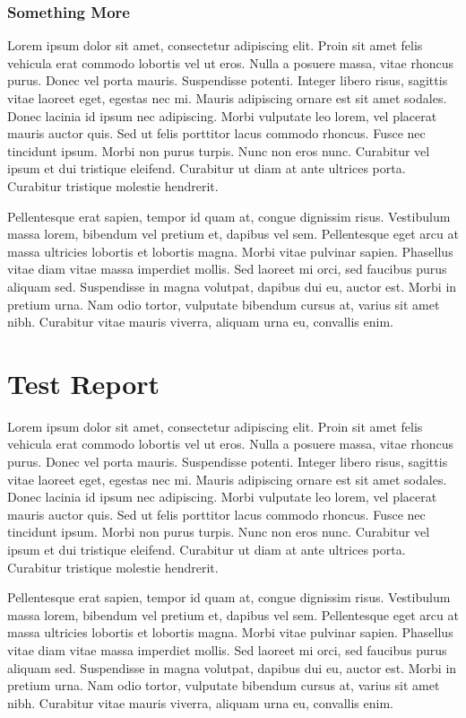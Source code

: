 \documentclass{vitmsprojectreport}
\begin{document}
\subsubsection{Something More}

Lorem ipsum dolor sit amet, consectetur adipiscing elit. Proin sit amet felis vehicula erat commodo lobortis vel ut eros. Nulla a posuere massa, vitae rhoncus purus. Donec vel porta mauris. Suspendisse potenti. Integer libero risus, sagittis vitae laoreet eget, egestas nec mi. Mauris adipiscing ornare est sit amet sodales. Donec lacinia id ipsum nec adipiscing. Morbi vulputate leo lorem, vel placerat mauris auctor quis. Sed ut felis porttitor lacus commodo rhoncus. Fusce nec tincidunt ipsum. Morbi non purus turpis. Nunc non eros nunc. Curabitur vel ipsum et dui tristique eleifend. Curabitur ut diam at ante ultrices porta. Curabitur tristique molestie hendrerit.

Pellentesque erat sapien, tempor id quam at, congue dignissim risus. Vestibulum massa lorem, bibendum vel pretium et, dapibus vel sem. Pellentesque eget arcu at massa ultricies lobortis et lobortis magna. Morbi vitae pulvinar sapien. Phasellus vitae diam vitae massa imperdiet mollis. Sed laoreet mi orci, sed faucibus purus aliquam sed. Suspendisse in magna volutpat, dapibus dui eu, auctor est. Morbi in pretium urna. Nam odio tortor, vulputate bibendum cursus at, varius sit amet nibh. Curabitur vitae mauris viverra, aliquam urna eu, convallis enim.

\section{Test Report}

Lorem ipsum dolor sit amet, consectetur adipiscing elit. Proin sit amet felis vehicula erat commodo lobortis vel ut eros. Nulla a posuere massa, vitae rhoncus purus. Donec vel porta mauris. Suspendisse potenti. Integer libero risus, sagittis vitae laoreet eget, egestas nec mi. Mauris adipiscing ornare est sit amet sodales. Donec lacinia id ipsum nec adipiscing. Morbi vulputate leo lorem, vel placerat mauris auctor quis. Sed ut felis porttitor lacus commodo rhoncus. Fusce nec tincidunt ipsum. Morbi non purus turpis. Nunc non eros nunc. Curabitur vel ipsum et dui tristique eleifend. Curabitur ut diam at ante ultrices porta. Curabitur tristique molestie hendrerit.

Pellentesque erat sapien, tempor id quam at, congue dignissim risus. Vestibulum massa lorem, bibendum vel pretium et, dapibus vel sem. Pellentesque eget arcu at massa ultricies lobortis et lobortis magna. Morbi vitae pulvinar sapien. Phasellus vitae diam vitae massa imperdiet mollis. Sed laoreet mi orci, sed faucibus purus aliquam sed. Suspendisse in magna volutpat, dapibus dui eu, auctor est. Morbi in pretium urna. Nam odio tortor, vulputate bibendum cursus at, varius sit amet nibh. Curabitur vitae mauris viverra, aliquam urna eu, convallis enim.
\end{document}
